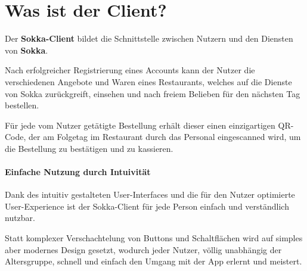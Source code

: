 \section{Was ist der Client?}

Der \textbf{Sokka-Client} bildet die Schnittstelle zwischen Nutzern und den Diensten von
\textbf{Sokka}.

Nach erfolgreicher Registrierung eines Accounts kann der Nutzer die verschiedenen Angebote und
Waren eines Restaurants, welches auf die Dienste von Sokka zurückgreift, einsehen und nach freiem
Belieben für den nächsten Tag bestellen.

Für jede vom Nutzer getätigte Bestellung erhält dieser einen einzigartigen QR-Code, der am
Folgetag im Restaurant durch das Personal eingescanned wird, um die Bestellung zu bestätigen 
und zu kassieren.

\paragraph{Einfache Nutzung durch Intuivität} Dank des intuitiv gestalteten User-Interfaces
und die für den Nutzer optimierte User-Experience ist der Sokka-Client für jede Person einfach
und verständlich nutzbar.

Statt komplexer Verschachtelung von Buttons und Schaltflächen wird auf simples aber modernes 
Design gesetzt, wodurch jeder Nutzer, völlig unabhängig der Altersgruppe, schnell und einfach den
Umgang mit der App erlernt und meistert.





